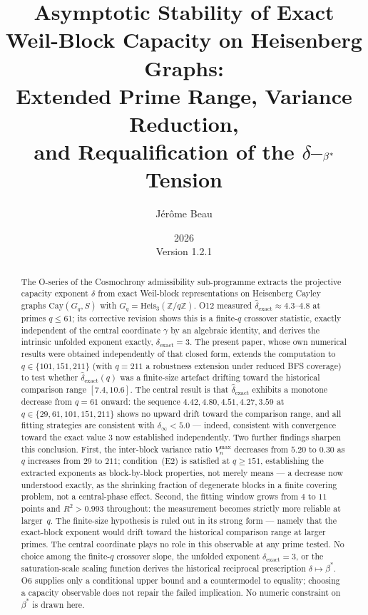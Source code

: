 \documentclass[11pt,a4paper]{article}
\title{Asymptotic Stability of Exact Weil-Block Capacity on Heisenberg Graphs:\\
Extended Prime Range, Variance Reduction,\\
and Requalification of the
\texorpdfstring{$\delta$--$\bstar$}{delta--beta*} Tension}
\author{J\'er\^ome Beau}
\date{2026\\Version 1.2.1}
\theoremstyle{plain}
\theoremstyle{definition}
\newcommand{\heis}{\mathrm{Heis}_3(\mathbb{Z}/q\mathbb{Z})}
\newcommand{\Gq}{G_q}
\newcommand{\dhat}{\hat\delta_{\mathrm{exact}}}
\newcommand{\bstar}{\beta^*}
\begin{document}
  \maketitle

  \begin{abstract}
    The O-series of the Cosmochrony admissibility sub-programme extracts the
    projective capacity exponent $\delta$ from exact Weil-block representations on
    Heisenberg Cayley graphs $\mathrm{Cay}(\Gq, S)$ with $\Gq = \heis$.
    O12 measured $\dhat \approx 4.3$--$4.8$ at primes $q \leq 61$; its corrective
    revision shows this is a finite-$q$ crossover statistic, exactly independent of
    the central coordinate $\gamma$ by an algebraic identity, and derives the
    intrinsic unfolded exponent exactly, $\delta_{\mathrm{exact}}=3$.
    The present paper, whose own numerical results were obtained independently of
    that closed form, extends the computation to $q \in \{101, 151, 211\}$
    (with $q=211$ a robustness extension under reduced BFS coverage) to test
    whether $\dhat(q)$ was a finite-size artefact drifting toward the
    historical comparison range $[7.4,10.6]$.
    The central result is that $\dhat$ exhibits a monotone decrease from $q = 61$
    onward: the sequence $4.42, 4.80, 4.51, 4.27, 3.59$ at
    $q \in \{29, 61, 101, 151, 211\}$ shows no upward drift toward the comparison range,
    and all fitting strategies are consistent with $\delta_\infty < 5.0$ — indeed,
    consistent with convergence toward the exact value $3$ now established
    independently.
    Two further findings sharpen this conclusion.
    First, the inter-block variance ratio $V_n^{\max}$ decreases from $5.20$ to
    $0.30$ as $q$ increases from $29$ to $211$; condition~(E2) is satisfied at
    $q \geq 151$, establishing the extracted exponents as block-by-block properties,
    not merely means — a decrease now understood exactly, as the shrinking
    fraction of degenerate blocks in a finite covering problem, not a central-phase
    effect.
    Second, the fitting window grows from $4$ to $11$ points and $R^2 > 0.993$
    throughout: the measurement becomes strictly more reliable at larger~$q$.
    The finite-size hypothesis is ruled out in its strong form --- namely that
    the exact-block exponent would drift toward the historical comparison range
    at larger primes.
    The central coordinate plays no role in this observable at any prime tested.
    No choice among the finite-$q$ crossover slope, the unfolded exponent
    $\delta_{\mathrm{exact}}=3$, or the saturation-scale scaling function derives
    the historical reciprocal prescription $\delta\mapsto\bstar$.
    O6 supplies only a conditional upper bound and a countermodel to equality;
    choosing a capacity observable does not repair the failed implication.
    No numeric constraint on $\bstar$ is drawn here.
  \end{abstract}
\end{document}
